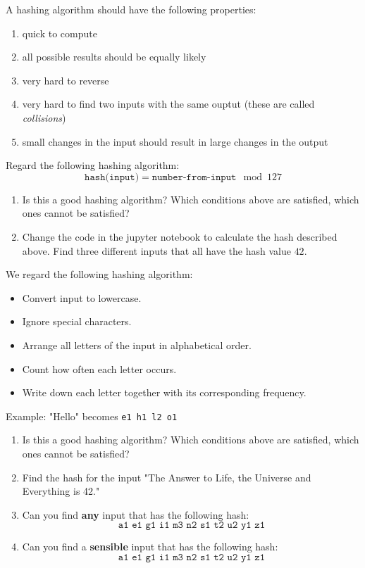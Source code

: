 \documentclass[11pt,a4paper]{report}
\begin{document}
A hashing algorithm should have the following properties:
\begin{enumerate}
\item  quick to compute
\item  all possible results should be equally likely
\item  very hard to reverse
\item  very hard to find two inputs with the same ouptut (these are called \emph{collisions})
\item  small changes in the input should result in large changes in the output
\end{enumerate}


\begin{ex}
Regard the following hashing algorithm: 
\[
\texttt{hash(input)} = \texttt{number-from-input} \mod 127
\]
\begin{enumerate}
\item Is this a good hashing algorithm? Which conditions above are satisfied, which ones cannot be satisfied?
\item Change the code in the jupyter notebook to calculate the hash described above. Find three different inputs that all have the hash value $42$.
\end{enumerate}

\end{ex}

\begin{ex}
We regard the following hashing algorithm: 
\begin{itemize}
\item Convert input to lowercase.
\item Ignore special characters.
\item Arrange all letters of the input in alphabetical order.
\item Count how often each letter occurs.
\item Write down  each letter together with its corresponding frequency.
\end{itemize}
Example: "Hello" becomes \texttt{e1 h1 l2 o1}
\begin{enumerate}
\item Is this a good hashing algorithm? Which conditions above are satisfied, which ones cannot be satisfied?
\item Find the hash for the input "The Answer to Life, the Universe and Everything is 42."
\item Can you find {\bf any} input that has the following hash:
\[
\texttt{a1 e1 g1 i1 m3 n2 s1 t2 u2 y1 z1}
\]
\item Can you find a {\bf sensible} input that has the following hash:
\[
\texttt{a1 e1 g1 i1 m3 n2 s1 t2 u2 y1 z1}
\]
\end{enumerate}
\end{ex}
\end{document}
